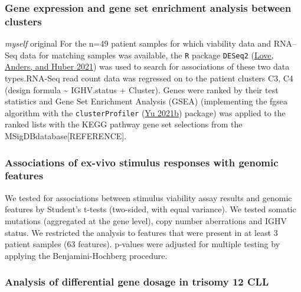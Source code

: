 \documentclass[11pt, a4paper, twosided]{book}
\begin{document}
\hypertarget{gene-expression-and-gene-set-enrichment-analysis-between-clusters}{%
\subsubsection{Gene expression and gene set enrichment analysis between clusters}\label{gene-expression-and-gene-set-enrichment-analysis-between-clusters}}

\emph{myself} original
For the n=49 patient samples for which viability data and RNA--Seq data for matching samples was available, the \texttt{R} package \texttt{DESeq2} (\protect\hyperlink{ref-R-DESeq2}{Love, Anders, and Huber 2021}) was used to search for associations of these two data types.RNA-Seq read count data was regressed on to the patient clusters C3, C4 (design formula \textasciitilde{} IGHV.status + Cluster). Genes were ranked by their test statistics and Gene Set Enrichment Analysis (GSEA) (implementing the fgsea algorithm with the \texttt{clusterProfiler} (\protect\hyperlink{ref-R-clusterProfiler}{Yu 2021b}) package) was applied to the ranked lists with the KEGG pathway gene set selections from the MSigDBdatabase{[}REFERENCE{]}.

\hypertarget{associations-of-ex-vivo-stimulus-responses-with-genomic-features}{%
\subsubsection{Associations of ex-vivo stimulus responses with genomic features}\label{associations-of-ex-vivo-stimulus-responses-with-genomic-features}}

We tested for associations between stimulus viability assay results and genomic features by Student's t-tests (two-sided, with equal variance). We tested somatic mutations (aggregated at the gene level), copy number aberrations and IGHV status. We restricted the analysis to features that were present in at least 3 patient samples (63 features). p-values were adjusted for multiple testing by applying the Benjamini-Hochberg procedure.

\hypertarget{gene-dosage-effects-method}{%
\subsubsection{Analysis of differential gene dosage in trisomy 12 CLL}\label{gene-dosage-effects-method}}
\end{document}
